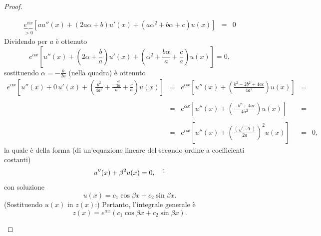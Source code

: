 \begin{proof}
\begin{enumerate}
\begin{equation*}
\begin{matrix}
				\underbrace{e^{\alpha x}}_{>0}[au''(x) + (2a\alpha + b)u'(x)+(a\alpha^2 + b\alpha + c)u(x)] &=& 0
			\end{matrix}
		\end{equation*}
		Dividendo per $a$ è ottenuto
		\begin{equation*}
			e^{\alpha x}\left[u''(x) + \left(2\alpha + \frac{b}{a}\right)u'(x)+\left(\alpha^2 + \frac{b\alpha}{a} + \frac{c}{a}\right)u(x)\right]=0,
		\end{equation*}
		sostituendo $\alpha=-\frac{b}{2a}$ (nella quadra) è ottenuto
		\begin{equation*}
			\begin{matrix}
				e^{\alpha x}\left[u''(x) + 0\, u'(x)+\left(\frac{b^2}{4a^2} + \frac{-\frac{b^2}{2a}}{a}+\frac{c}{a}\right)u(x)\right] &=& e^{\alpha x}\left[u''(x) + \left(\frac{b^2-2b^2+4ac}{4a^2}\right)u(x)\right] &=&\\\\
				&=& e^{\alpha x}\left[u''(x) +\left(\frac{-b^2+4ac}{4a^2}\right)u(x)\right] &=&\\\\
				&=& e^{\alpha x}\left[u''(x) + \left(\frac{(\sqrt{-\Delta})}{2a}\right)^2u(x)\right] &=& 0,
			\end{matrix}
		\end{equation*}
		la quale è della forma (di un'equazione lineare del secondo ordine a coefficienti costanti)
		\begin{equation*}
			u''(x) + \beta^2 u(x) = 0, \quad\footnotemark
		\end{equation*}
		con soluzione
		\begin{equation*}
			u(x) = c_1\cos\beta x + c_2 \sin\beta x.
		\end{equation*}
		\noindent (Sostituendo $u(x)$ in $z(x)$:) Pertanto, l'integrale generale è
		\begin{equation*}
			z(x) = e^{\alpha x}(c_1\cos\beta x + c_2\sin\beta x).
		\end{equation*} 
	\end{enumerate}
\end{proof}

